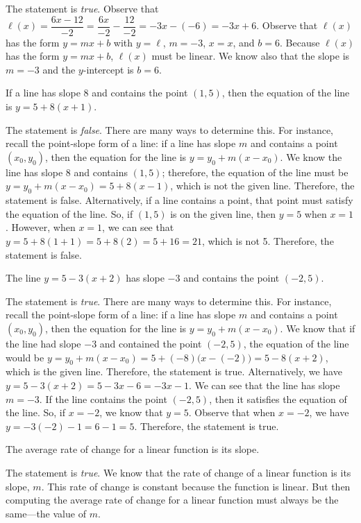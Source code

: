 \documentclass[11pt,letterpaper]{article}
\begin{document}
\sol The statement is \textit{true}. Observe that $\ell(x)= \dfrac{6x - 12}{-2}= \dfrac{6x}{-2} - \dfrac{12}{-2}= -3x - (-6)= -3x + 6$. Observe that $\ell(x)$ has the form $y= mx + b$ with $y= \ell$, $m= -3$, $x= x$, and $b= 6$. Because $\ell(x)$ has the form $y= mx + b$, $\ell(x)$ must be linear. We know also that the slope is $m= -3$ and the $y$-intercept is $b= 6$. \pvspace{1.3cm}



 If a line has slope $8$ and contains the point $(1, 5)$, then the equation of the line is $y= 5 + 8(x + 1)$. \pspace

\sol The statement is \textit{false}. There are many ways to determine this. For instance, recall the point-slope form of a line: if a line has slope $m$ and contains a point $(x_0, y_0)$, then the equation for the line is $y= y_0 + m(x - x_0)$. We know the line has slope 8 and contains $(1, 5)$; therefore, the equation of the line must be $y= y_0 + m(x - x_0)= 5 + 8(x - 1)$, which is not the given line. Therefore, the statement is false. Alternatively, if a line contains a point, that point must satisfy the equation of the line. So, if $(1, 5)$ is on the given line, then $y= 5$ when $x= 1$. However, when $x= 1$, we can see that $y= 5 + 8(1 + 1)= 5 + 8(2)= 5 + 16= 21$, which is not 5. Therefore, the statement is false. \pvspace{1.3cm}



 The line $y= 5 - 3(x + 2)$ has slope $-3$ and contains the point $(-2, 5)$. \pspace

\sol The statement is \textit{true}. There are many ways to determine this. For instance, recall the point-slope form of a line: if a line has slope $m$ and contains a point $(x_0, y_0)$, then the equation for the line is $y= y_0 + m(x - x_0)$. We know that if the line had slope $-3$ and contained the point $(-2, 5)$, the equation of the line would be $y= y_0 + m(x - x_0)= 5 + (-8) \big(x - (-2) \big)= 5 - 8(x + 2)$, which is the given line. Therefore, the statement is true. Alternatively, we have $y= 5 - 3(x + 2)= 5 - 3x - 6= -3x - 1$. We can see that the line has slope $m= -3$. If the line contains the point $(-2, 5)$, then it satisfies the equation of the line. So, if $x= -2$, we know that $y= 5$. Observe that when $x= -2$, we have $y= -3(-2) - 1= 6 - 1= 5$. Therefore, the statement is true. \pvspace{1.3cm}



 The average rate of change for a linear function is its slope. \pspace

\sol The statement is \textit{true}. We know that the rate of change of a linear function is its slope, $m$. This rate of change is constant because the function is linear. But then computing the average rate of change for a linear function must always be the same---the value of $m$. \pvspace{1.3cm}
\end{document}
